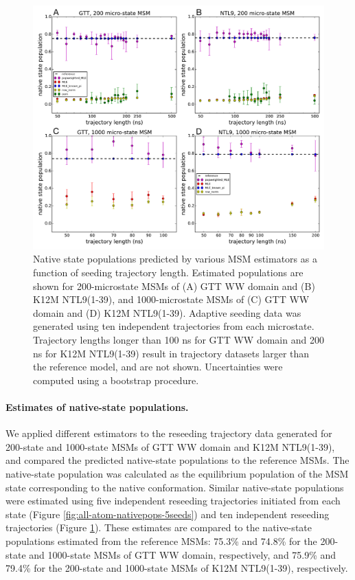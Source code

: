 \documentclass[%
 aip,
rsi,%
 amsmath,amssymb,
 reprint,%
]{revtex4-1}
\begin{document}
\begin{figure}[ht!]
\includegraphics[width=0.55\paperwidth]{figures/native_population_10trajs_cluster200_1000_omi_new.pdf}%
\caption{Native state populations predicted by various MSM estimators as a function of seeding trajectory length. Estimated populations are shown for 200-microstate MSMs of (A) GTT WW domain and (B) K12M NTL9(1-39), and 1000-microstate MSMs of (C) GTT WW domain and (D) K12M NTL9(1-39). Adaptive seeding data was generated using ten independent trajectories from each microstate. Trajectory lengths longer than 100 ns for GTT WW domain and 200 ns for K12M NTL9(1-39) result in trajectory datasets larger than the reference model, and are not shown. Uncertainties were computed using a bootstrap procedure.}
\label{fig:all-atom-nativepops-10seeds}
\end{figure}



\paragraph{Estimates of native-state populations.}

We applied different estimators to the reseeding trajectory data generated for 200-state and 1000-state MSMs of GTT WW domain and K12M NTL9(1-39), and compared the predicted native-state populations to the reference MSMs. The native-state population was calculated as the equilibrium population of the MSM state corresponding to the native conformation.  Similar native-state populations were estimated using five independent reseeding trajectories initiated from each state (Figure \ref{fig:all-atom-nativepops-5seeds}) and ten independent reseeding trajectories (Figure \ref{fig:all-atom-nativepops-10seeds}). These estimates are compared to the native-state populations estimated from the reference MSMs: 75.3\% and 74.8\% for the 200-state and 1000-state MSMs of GTT WW domain, respectively, and 75.9\% and 79.4\% for the 200-state and 1000-state MSMs of K12M NTL9(1-39), respectively.
\end{document}
